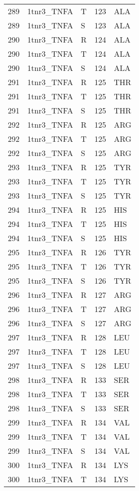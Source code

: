 \begin{longtable}[l]{l|l|l|l|l}
	289 & 1tnr3_TNFA & T & 123 & ALA \\
	289 & 1tnr3_TNFA & S & 123 & ALA \\
	290 & 1tnr3_TNFA & R & 124 & ALA \\
	290 & 1tnr3_TNFA & T & 124 & ALA \\
	290 & 1tnr3_TNFA & S & 124 & ALA \\
	291 & 1tnr3_TNFA & R & 125 & THR \\
	291 & 1tnr3_TNFA & T & 125 & THR \\
	291 & 1tnr3_TNFA & S & 125 & THR \\
	292 & 1tnr3_TNFA & R & 125 & ARG \\
	292 & 1tnr3_TNFA & T & 125 & ARG \\
	292 & 1tnr3_TNFA & S & 125 & ARG \\
	293 & 1tnr3_TNFA & R & 125 & TYR \\
	293 & 1tnr3_TNFA & T & 125 & TYR \\
	293 & 1tnr3_TNFA & S & 125 & TYR \\
	294 & 1tnr3_TNFA & R & 125 & HIS \\
	294 & 1tnr3_TNFA & T & 125 & HIS \\
	294 & 1tnr3_TNFA & S & 125 & HIS \\
	295 & 1tnr3_TNFA & R & 126 & TYR \\
	295 & 1tnr3_TNFA & T & 126 & TYR \\
	295 & 1tnr3_TNFA & S & 126 & TYR \\
	296 & 1tnr3_TNFA & R & 127 & ARG \\
	296 & 1tnr3_TNFA & T & 127 & ARG \\
	296 & 1tnr3_TNFA & S & 127 & ARG \\
	297 & 1tnr3_TNFA & R & 128 & LEU \\
	297 & 1tnr3_TNFA & T & 128 & LEU \\
	297 & 1tnr3_TNFA & S & 128 & LEU \\
	298 & 1tnr3_TNFA & R & 133 & SER \\
	298 & 1tnr3_TNFA & T & 133 & SER \\
	298 & 1tnr3_TNFA & S & 133 & SER \\
	299 & 1tnr3_TNFA & R & 134 & VAL \\
	299 & 1tnr3_TNFA & T & 134 & VAL \\
	299 & 1tnr3_TNFA & S & 134 & VAL \\
	300 & 1tnr3_TNFA & R & 134 & LYS \\
	300 & 1tnr3_TNFA & T & 134 & LYS \\

\end{longtable}
